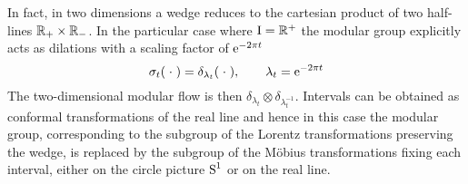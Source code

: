  In fact, in two dimensions a wedge reduces to the cartesian 
 product of two half-lines $\mathbb{R}_+\times\mathbb{R}_-$. In the particular
 case where $\textrm{I}=\mathbb{R}^+$ the modular group explicitly acts as dilations
 with a scaling factor of $\operatorname{e}^{-2\pi t}$
 \[
 \sigma_t(\;{\cdot}\;)=\delta_{\lambda_t}(\;{\cdot}\;),
 \qquad \lambda_t=\operatorname{e}^{-2\pi t}
 \]
 The two-dimensional modular flow is then $\delta_{\lambda_t}
 \otimes\delta_{\lambda^{-1}_t}$. Intervals can be obtained 
 as conformal transformations of the real line and hence 
 in this case the modular group, corresponding to the 
 subgroup of the Lorentz transformations preserving the wedge, 
 is replaced by the subgroup of the M\"obius transformations 
 fixing each interval, either on the circle picture $\textrm{S}^1$ or 
 on the real line.
 
 \begin{minipage}{.35\textwidth}
 \centering 
 \end{minipage}
 \qquad
 \begin{minipage}{.60\textwidth}
 \end{minipage} 
 
